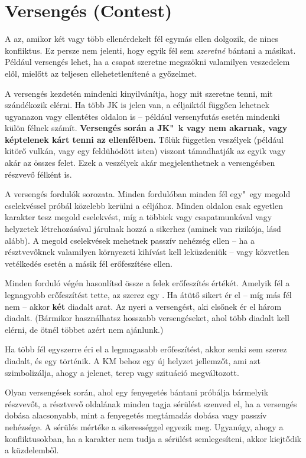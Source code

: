 \section[Versengés]{Versengés (Contest)}

A  az, amikor két vagy több ellenérdekelt fél egymás ellen dolgozik, de nincs konfliktus. Ez persze nem jelenti, hogy egyik fél sem \emph{szeretné} bántani a másikat. Például versengés lehet, ha a csapat szeretne megszökni valamilyen veszedelem elől, mielőtt az teljesen ellehetetlenítené a győzelmet.

A versengés kezdetén mindenki kinyilvánítja, hogy mit szeretne tenni, mit szándékozik elérni. Ha több JK is jelen van, a céljaiktól függően lehetnek ugyanazon vagy ellentétes oldalon is -- például versenyfutás esetén mindenki külön félnek számít. \textbf{Versengés során a JK"~k vagy nem akarnak, vagy képtelenek kárt tenni az ellenfélben.} Tőlük független veszélyek (például kitörő vulkán, vagy egy feldühödött isten) viszont támadhatják az egyik vagy akár az összes felet. Ezek a veszélyek akár megjelenthetnek a versengésben részvevő félként is.

A versengés fordulók sorozata. Minden fordulóban minden fél egy"~egy megold cselekvéssel próbál közelebb kerülni a céljához. Minden oldalon csak egyetlen karakter tesz megold cselekvést, míg a többiek vagy csapatmunkával vagy helyzetek létrehozásával járulnak hozzá a sikerhez (aminek van rizikója, lásd alább). A megold cselekvések mehetnek passzív nehézség ellen -- ha a résztvevőknek valamilyen környezeti kihívást kell leküzdeniük -- vagy közvetlen vetélkedés esetén a másik fél erőfeszítése ellen.

Minden forduló végén hasonlítsd össze a felek erőfeszítés értékét. Amelyik fél a legnagyobb erőfeszítést tette, az szerez egy . Ha átütő sikert ér el -- míg más fél nem -- akkor \textbf{két} diadalt arat. Az nyeri a versengést, aki elsőnek ér el három diadalt. (Bármikor használhatsz hosszabb versengéseket, ahol több diadalt kell elérni, de ötnél többet azért nem ajánlunk.)

Ha több fél egyszerre éri el a legmagasabb erőfeszítést, akkor senki sem szerez diadalt, és egy  történik. A KM behoz egy új helyzet jellemzőt, ami azt szimbolizálja, ahogy a jelenet, terep vagy szituáció megváltozott.

Olyan versengések során, ahol egy fenyegetés bántani próbálja bármelyik részvevőt, a résztvevő oldalának minden tagja sérülést szenved el, ha a versengés dobása alacsonyabb, mint a fenyegetés megtámadás dobása vagy passzív nehézsége. A sérülés mértéke a sikerességgel egyezik meg. Ugyanúgy, ahogy a konfliktusokban, ha a karakter nem tudja a sérülést semlegesíteni, akkor kiejtődik a küzdelemből.

